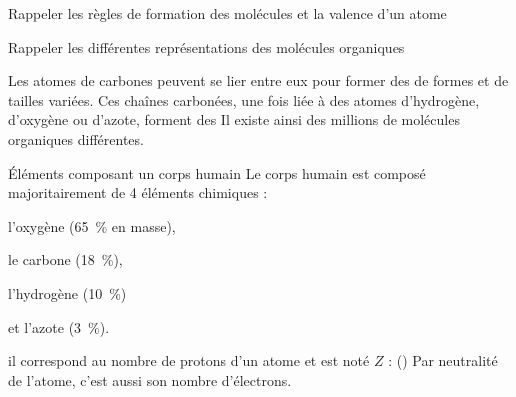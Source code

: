 \teteTermStssOrga
{}

\begin{objectifs}
  \item Rappeler les règles de formation des molécules et la valence d'un atome
  \item Rappeler les différentes représentations des molécules organiques
\end{objectifs}

\begin{contexte}
  Les atomes de carbones peuvent se lier entre eux pour former des  de formes et de tailles variées.
  Ces chaînes carbonées, une fois liée à des atomes d'hydrogène, d'oxygène ou d'azote, forment des 
  Il existe ainsi des millions de molécules organiques différentes.

\end{contexte}


\vspace*{-12pt}

\begin{doc}{Éléments composant un corps humain}
  Le corps humain est composé majoritairement de 4 éléments chimiques :
  \vspace*{-4pt}
  \begin{listePoints}[2]
    \item l'oxygène   \oxygene (\qty{65}{\percent} en masse),
    \item le carbone  \carbone (\qty{18}{\percent}),
    \item l'hydrogène \hydrogene (\qty{10}{\percent})
    \item et l'azote   (\qty{3}{\percent}).
  \end{listePoints}
  
  \begin{importants}
     il correspond au nombre de protons d'un atome et est noté $Z$ :  (\hspace{-8pt}\exemple {})
    Par neutralité de l'atome, c'est aussi son nombre d'électrons.
  \end{importants}
\end{doc}


